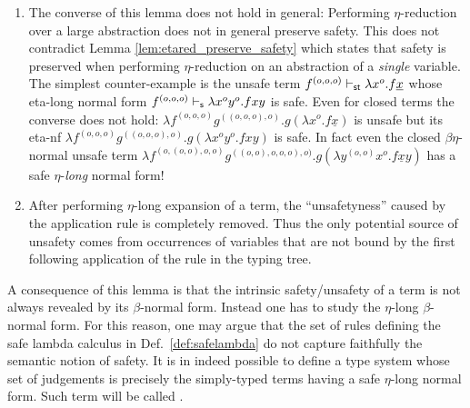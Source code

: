 \begin{remark}\hfill
\begin{enumerate}
\item
The converse of this lemma does not hold in general: Performing
$\eta$-reduction over a large abstraction does not in general
preserve safety. This does not contradict Lemma
  \ref{lem:etared_preserve_safety} which states that safety is
  preserved when performing $\eta$-reduction on an abstraction
  of a \emph{single} variable. The simplest counter-example is
  the
 unsafe term $f^{(o,o,o)} \vdash_{\sf st} \lambda x^o . f \underline{x}$
whose eta-long normal form $f^{(o,o,o)} \vdash_{\sf s} \lambda x^o y^o .
f x y$ is safe. Even for closed terms the converse does not
hold: $\lambda f^{(o,o,o)} g^{((o,o,o),o)} . g(\lambda x^o . f
\underline{x})$ is unsafe but its eta-nf $\lambda f^{(o,o,o)}
g^{((o,o,o),o)} . g(\lambda x^o y^o. f x y)$ is safe. In fact
even the closed $\beta\eta$-normal unsafe term $\lambda
f^{(o,(o,o),o,o)} g^{((o,o),o,o,o),o)} . g(\lambda y^{(o,o)} x^o
. f \underline{x} y)$ has a safe $\eta$-\emph{long} normal form!

  \item After performing $\eta$-long expansion of a term, the ``unsafetyness'' caused by the application rule is
  completely removed. Thus the only potential source of unsafety
  comes from occurrences of variables that are not bound by the
  first following application of the  rule in the
  typing tree.
  \end{enumerate}
\end{remark}


A consequence of this lemma is that the intrinsic safety/unsafety of
a term is not always revealed by its $\beta$-normal form. Instead one
has to study the $\eta$-long $\beta$-normal form.
For this reason, one may argue that the set of rules defining the safe lambda calculus
in Def.~\ref{def:safelambda} do not capture faithfully the semantic notion of safety.
It is in indeed possible to define a type system whose set of judgements is precisely the simply-typed terms
having a safe $\eta$-long normal form. Such term will be called .




